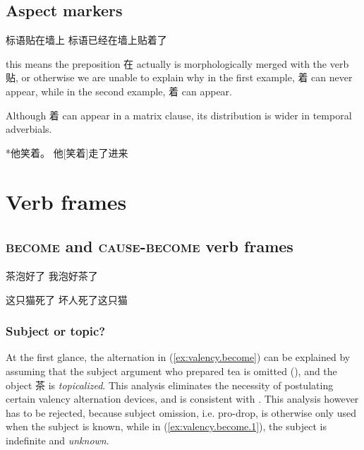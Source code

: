 \documentclass[UTF8, a4paper, oneside, scheme=plain, 12pt]{ctexrep}
\newcommand*{\category}[1]{\textsc{#1}}
\begin{document}
\section{Aspect markers}

\begin{exe}
    \ex 标语贴在墙上 
    \ex 标语已经在墙上贴着了
\end{exe}
 
this means the preposition 在 actually is morphologically merged with the verb 贴, 
or otherwise we are unable to explain why 
in the first example, 着 can never appear, 
while in the second example, 着 can appear.

Although 着 can appear in a matrix clause, 
its distribution is wider in temporal adverbials. 

*他笑着。
他[笑着]走了进来

\chapter{Verb frames}\label{chap:verb-frames}

\section{\category{become} and \category{cause}-\category{become} verb frames}

\begin{exe}
    \ex\label{ex:valency.become} \begin{xlist}
        \ex\label{ex:valency.become.1} 茶泡好了
        \ex 我泡好茶了
    \end{xlist}

    \ex\label{ex:valency.become-only}
    \begin{xlist}
        \ex\label{ex:valency.become-only.1} 这只猫死了
        \ex *坏人死了这只猫
    \end{xlist}
\end{exe}

\subsection{Subject or topic?}\label{sec:valency.become.subject-or-topic}

At the first glance, the alternation in (\ref{ex:valency.become})
can be explained by assuming that the 
subject argument who prepared tea is omitted (),
and the object 茶 is \emph{topicalized}.
This analysis eliminates the necessity of postulating certain valency alternation devices,
and is consistent with \citet{lapolla20091}.
This analysis however has to be rejected,
because subject omission, i.e. pro-drop,
is otherwise only used when the subject is known,
while in (\ref{ex:valency.become.1}),
the subject is indefinite and \emph{unknown}.
\end{document}

